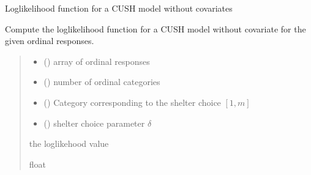 \documentclass[letterpaper,10pt,english]{sphinxmanual}
\begin{document}
\begin{fulllineitems}
\label{\detokenize{cubmods:cubmods.cush.loglik}}
\pysigstartsignatures
{}
\pysigstopsignatures
\sphinxAtStartPar
Log\sphinxhyphen{}likelihood function for a CUSH model without covariates

\sphinxAtStartPar
Compute the log\sphinxhyphen{}likelihood function for a CUSH model 
without covariate for the given ordinal responses.
\begin{quote}\begin{description}
\begin{itemize}
\item {} 
\sphinxAtStartPar
{} () \textendash{} array of ordinal responses

\item {} 
\sphinxAtStartPar
{} () \textendash{} number of ordinal categories

\item {} 
\sphinxAtStartPar
{} () \textendash{} Category corresponding to the shelter choice \([1,m]\)

\item {} 
\sphinxAtStartPar
{} () \textendash{} shelter choice parameter \(\delta\)

\end{itemize}

\sphinxAtStartPar
the log\sphinxhyphen{}likehood value

\sphinxAtStartPar
float

\end{description}\end{quote}

\end{fulllineitems}
\end{document}
